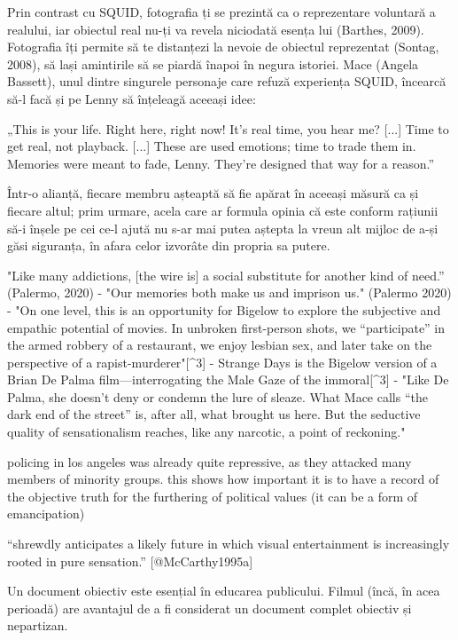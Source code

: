 \documentclass[12pt]{article}
\begin{document}
Prin contrast cu SQUID, fotografia ți se prezintă ca o reprezentare voluntară a realului, iar obiectul real nu-ți va revela niciodată esența lui (Barthes, 2009). Fotografia îți permite să te distanțezi la nevoie de obiectul reprezentat (Sontag, 2008), să lași amintirile să se piardă înapoi în negura istoriei. Mace (Angela Bassett), unul dintre singurele personaje care refuză experiența SQUID, încearcă să-l facă și pe Lenny să înțeleagă aceeași idee:

„This is your life. Right here, right now! It’s real time, you hear me? [...] Time to get real, not playback. [...] These are used emotions; time to trade them in. Memories were meant to fade, Lenny. They’re designed that way for a reason.”

\begin{displayquote}
	Într-o alianță, fiecare membru așteaptă să fie apărat în aceeași măsură ca și fiecare altul; prim urmare, acela care ar formula opinia că este conform rațiunii să-i înșele pe cei ce-l ajută nu s-ar mai putea aștepta la vreun alt mijloc de a-și găsi siguranța, în afara celor izvorâte din propria sa putere.
\end{displayquote}


"Like many addictions, [the wire is] a social substitute for another kind of need.” (Palermo, 2020)
- "Our memories both make us and imprison us." (Palermo 2020)
- "On one level, this is an opportunity for Bigelow to explore the subjective and empathic potential of movies. In unbroken first-person shots, we “participate” in the armed robbery of a restaurant, we enjoy lesbian sex, and later take on the perspective of a rapist-murderer"[^3]
- Strange Days is the Bigelow version of a Brian De Palma film—interrogating the Male Gaze of the immoral[^3]
- "Like De Palma, she doesn’t deny or condemn the lure of sleaze. What Mace calls “the dark end of the street” is, after all, what brought us here. But the seductive quality of sensationalism reaches, like any narcotic, a point of reckoning."

policing in los angeles was already quite repressive, as they attacked many members of minority groups. this shows how important it is to have a record of the objective truth for the furthering of political values (it can be a form of emancipation)

“shrewdly anticipates a likely future in which visual entertainment is increasingly rooted in pure sensation.” [@McCarthy1995a]

Un document obiectiv este esențial în educarea publicului. Filmul (încă, în acea perioadă) are avantajul de a fi considerat un document complet obiectiv și nepartizan.
\end{document}
